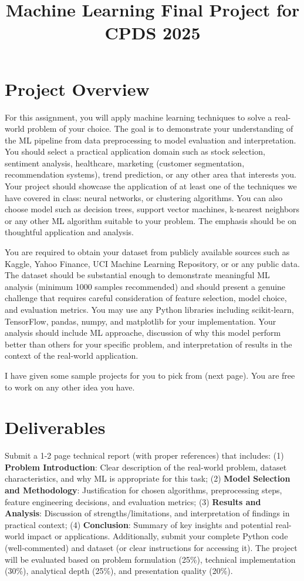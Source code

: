 \documentclass{article}
\title{Machine Learning Final Project for CPDS 2025}
\date{}
\begin{document}
\maketitle

\section*{Project Overview}

For this assignment, you will apply machine learning techniques to solve a real-world problem of your choice. The goal is to demonstrate your understanding of the ML pipeline from data preprocessing to model evaluation and interpretation. You should select a practical application domain such as stock selection, sentiment analysis, healthcare, marketing (customer segmentation, recommendation systems), trend prediction, or any other area that interests you. Your project should showcase the application of at least one of the techniques we have covered in class: neural networks, or clustering algorithms. You can also choose model such as decision trees, support vector machines, k-nearest neighbors or any other ML algorithm suitable to your problem. The emphasis should be on thoughtful application and analysis.

You are required to obtain your dataset from publicly available sources such as Kaggle, Yahoo Finance, UCI Machine Learning Repository, or or any public data. The dataset should be substantial enough to demonstrate meaningful ML analysis (minimum 1000 samples recommended) and should present a genuine challenge that requires careful consideration of feature selection, model choice, and evaluation metrics. You may use any Python libraries including scikit-learn, TensorFlow, pandas, numpy, and matplotlib for your implementation. Your analysis should include ML approache, discussion of why this model perform better than others for your specific problem, and interpretation of results in the context of the real-world application.

I have given some sample projects for you to pick from (next page). You are free to work on any other idea you have. 

\section*{Deliverables}

Submit a 1-2 page technical report (with proper references) that includes: (1) \textbf{Problem Introduction}: Clear description of the real-world problem, dataset characteristics, and why ML is appropriate for this task; (2) \textbf{Model Selection and Methodology}: Justification for chosen algorithms, preprocessing steps, feature engineering decisions, and evaluation metrics; (3) \textbf{Results and Analysis}: Discussion of strengths/limitations, and interpretation of findings in practical context; (4) \textbf{Conclusion}: Summary of key insights and potential real-world impact or applications. Additionally, submit your complete Python code (well-commented) and dataset (or clear instructions for accessing it). The project will be evaluated based on problem formulation (25\%), technical implementation (30\%), analytical depth (25\%), and presentation quality (20\%).
\end{document}
